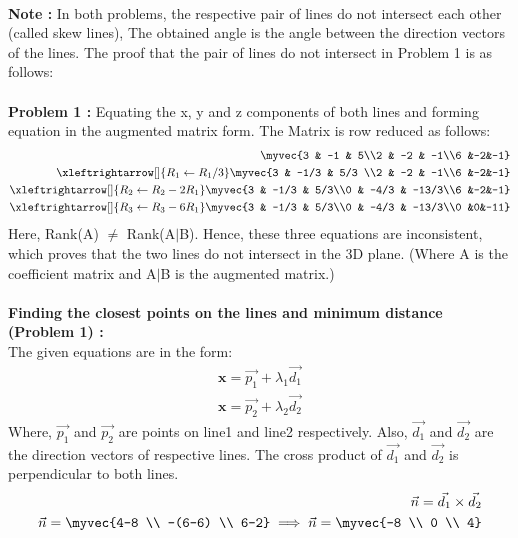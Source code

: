 \documentclass[journal,12pt,twocolumn]{IEEEtran}
\begin{document}
\\
\textbf{Note :} In both problems, the respective pair of lines do not intersect each other (called skew lines), The obtained angle is the angle between the direction vectors of the lines. The proof that the pair of lines do not intersect in Problem 1 is as follows:\\
\\
\textbf{Problem 1 :} Equating the x, y and z components of both lines and forming equation in the augmented matrix form. The Matrix is row reduced as follows:
\begin{align}
\myvec{3 & -1 & 5\\2 & -2 & -1\\6 &-2&-1}\\
\xleftrightarrow[]{R_1\leftarrow R_1/3}
\myvec{3 & -1/3 & 5/3 \\2 & -2 & -1\\6 &-2&-1}\\
\xleftrightarrow[]{R_2\leftarrow R_2-2R_1}   
\myvec{3 & -1/3 & 5/3\\0 & -4/3 & -13/3\\6 &-2&-1}\\
\xleftrightarrow[]{R_3\leftarrow R_3-6R_1}
\myvec{3 & -1/3 & 5/3\\0 & -4/3 & -13/3\\0 &0&-11}
\end{align} 
Here, Rank(A) $\neq$ Rank(A$\mid$B). Hence, these three equations are inconsistent, which proves that the two lines do not intersect in the 3D plane. (Where A is the coefficient matrix and A$\mid$B is the augmented matrix.) \\
\\
\textbf{Finding the closest points on the lines and minimum distance (Problem 1) :}
\\
The given equations are in the form:
\begin{align}
    \textbf{x}=\vec{p_1} + \lambda_1\vec{d_1}\\
    \textbf{x}=\vec{p_2} + \lambda_2\vec{d_2}
\end{align}
\newline
Where, $\vec{p_1}$ and $\vec{p_2}$ are points on line1 and line2 respectively. Also, $\vec{d_1}$ and $\vec{d_2}$ are the direction vectors of respective lines.
The cross product of $\vec{d_1}$ and $\vec{d_2}$ is perpendicular to both lines.
\begin{align}
    \vec{n} = \vec{d_1} \times \vec{d_2}\\
     \vec{n}=\myvec{4-8 \\ -(6-6) \\ 6-2}
     \implies \vec{n}=\myvec{-8 \\ 0 \\ 4}
\end{align}
\end{document}
